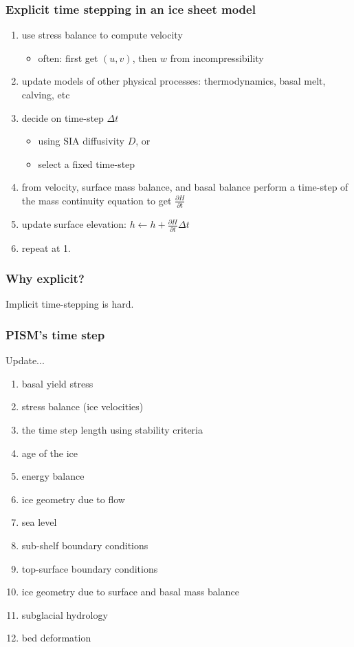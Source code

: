 \documentclass[hide notes,intlimits]{beamer}
\newcommand{\diff}[2]{\frac{\partial #1}{\partial #2}}
\begin{document}
\begin{frame}
  \frametitle{Explicit time stepping in an ice sheet model}

  \begin{enumerate}
  \item use stress balance to compute velocity
    \begin{itemize}
    \item often: first get $(u,v)$, then $w$ from incompressibility
    \end{itemize}
  \item update models of other physical processes: thermodynamics, basal melt, calving, etc
  \item decide on time-step $\Delta t$
    \begin{itemize}
    \item using SIA diffusivity $D$, or
    \item select a fixed time-step
    \end{itemize}
  \item from velocity, surface mass balance, and basal balance perform
    a time-step of the mass continuity equation to get $\diff{H}{t}$
  \item update surface elevation: $h \gets h + \diff{H}{t} \Delta t$
  \item repeat at 1.
  \end{enumerate}
\end{frame}

\begin{frame}
  \frametitle{Why explicit?}

  Implicit time-stepping is hard.
\end{frame}

\begin{frame}
  \frametitle{PISM's time step}
  Update...
  \begin{enumerate}
  \item basal yield stress
  \item stress balance (ice velocities)
  \item the time step length using stability criteria
  \item age of the ice
  \item energy balance
  \item ice geometry due to flow
  \item sea level
  \item sub-shelf boundary conditions
  \item top-surface boundary conditions
  \item ice geometry due to surface and basal mass balance
  \item subglacial hydrology
  \item bed deformation
  \end{enumerate}
\end{frame}
\end{document}
